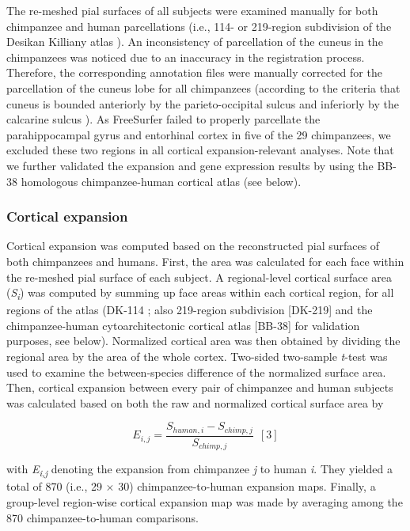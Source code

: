 \begin{refsection}
The re-meshed pial surfaces of all subjects were examined manually for both chimpanzee and human parcellations (i.e., 114- or 219-region subdivision of the Desikan Killiany atlas \citep{DESIKAN2006968,CAMMOUN2012386}). An inconsistency of parcellation of the cuneus in the chimpanzees was noticed due to an inaccuracy in the registration process. Therefore, the corresponding annotation files were manually corrected for the parcellation of the cuneus lobe for all chimpanzees (according to the criteria that cuneus is bounded anteriorly by the parieto-occipital sulcus and inferiorly by the calcarine sulcus \citep{Scholtens2015ECONOMO}). As FreeSurfer failed to properly parcellate the parahippocampal gyrus and entorhinal cortex in five of the 29 chimpanzees, we excluded these two regions in all cortical expansion-relevant analyses. Note that we further validated the expansion and gene expression results by using the BB-38 homologous chimpanzee-human cortical atlas \citep{Heuvel2019EvolutionaryMI} (see below).

\subsubsection*{Cortical expansion}
Cortical expansion was computed based on the reconstructed pial surfaces of both chimpanzees and humans. First, the area was calculated for each face within the re-meshed pial surface of each subject. A regional-level cortical surface area (\textit{S\textsubscript{i}}) was computed by summing up face areas within each cortical region, for all regions of the atlas (DK-114 \citep{CAMMOUN2012386,DESIKAN2006968}; also 219-region subdivision [DK-219] and the chimpanzee-human cytoarchitectonic cortical atlas [BB-38] for validation purposes, see below). Normalized cortical area was then obtained by dividing the regional area by the area of the whole cortex. Two-sided two-sample \textit{t}-test was used to examine the between-species difference of the normalized surface area. Then, cortical expansion between every pair of chimpanzee and human subjects was calculated based on both the raw and normalized cortical surface area by

\[ E_{i,j}=\frac{S_{human,i}-S_{chimp,j}}{S_{chimp,j}} \ \ [3] \]

\noindent
with \textit{E\textsubscript{i,j} }denoting the expansion from chimpanzee \textit{j} to human \textit{i}. They yielded a total of 870 (i.e., 29 $ \times $  30) chimpanzee-to-human expansion maps. Finally, a group-level region-wise cortical expansion map was made by averaging among the 870 chimpanzee-to-human comparisons.


\end{refsection}
